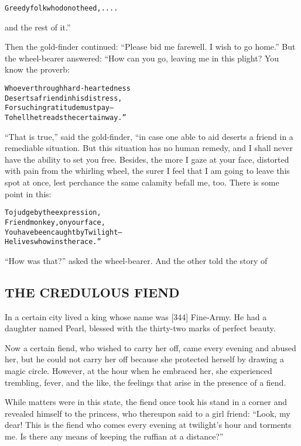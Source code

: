 \documentclass{article}
\renewenvironment{verbatim}{\begin{alltt}\normalfont\begin{centering}}{\end{centering}\end{alltt}}
\begin{document}
\begin{verbatim}
Greedy folk who do not heed, ....
\end{verbatim}
and the rest of it.”

Then the gold-finder continued:
``Please bid me farewell. I wish to go home.'' But the wheel-bearer
answered: “How can you go, leaving me in this plight? You know the
proverb:

\begin{verbatim}
Whoever through hard-heartedness
Deserts a friend in his distress,
For such ingratitude must pay--
To hell he treads the certain way.”
\end{verbatim}
``That is true,'' said the gold-finder, “in case one able to aid
deserts a friend in a remediable situation. But this situation has
no human remedy, and I shall never have the ability to set you
free. Besides, the more I gaze at your face, distorted with pain
from the whirling wheel, the surer I feel that I am going to leave
this spot at once, lest perchance the same calamity befall me, too.
There is some point in this:

\begin{verbatim}
To judge by the expression,
    Friend monkey, on your face,
You have been caught by Twilight--
    He lives who wins the race.”
\end{verbatim}
``How was that?'' asked the wheel-bearer. And the other told the
story of

\subsection{THE CREDULOUS FIEND}

In a certain city lived a king whose name was [344] Fine-Army. He
had a daughter named Pearl, blessed with the thirty-two marks of
perfect beauty.

Now a certain fiend, who wished to carry her off, came every
evening and abused her, but he could not carry her off because she
protected herself by drawing a magic circle. However, at the hour
when he embraced her, she experienced trembling, fever, and the
like, the feelings that arise in the presence of a fiend.

While matters were in this state, the fiend once took his stand in
a corner and revealed himself to the princess, who thereupon said
to a girl friend:
``Look, my dear! This is the fiend who comes every evening at twilight's hour and torments me. Is there any means of keeping the ruffian at a distance?''
\end{document}
